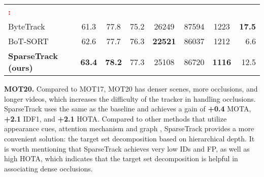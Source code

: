 \begin{table}[t]
{\begin{tabular}{ l | c c c c c c r}
\midrule
\textcolor{red}{\textbf{  :}}\\
ByteTrack\cite{bytetrack} & 61.3 & 77.8 & 75.2 & 26249 & 87594 & 1223 & \textbf{17.5}\\
BoT-SORT\cite{BoT-SORT} & 62.6 & 77.7 & 76.3 & \textbf{22521} & 86037 & 1212 & 6.6 \\
\textbf{SparseTrack (ours)} & \textbf{63.4} & \textbf{78.2} & 77.3 & 25108 & 86720 & \textbf{1116} & 12.5\\
\bottomrule
\end{tabular}
}
\end{table}

\textbf{MOT20.} Compared to MOT17, MOT20 has denser scenes, more occlusions, and longer videos, which increases the difficulty of the tracker in handling occlusions. SparseTrack uses the same  as the baseline and achieves a gain of \textbf{+0.4} MOTA, \textbf{+2.1} IDF1, and \textbf{+2.1} HOTA. Compared to other methods that utilize appearance cues, attention mechanism \cite{attention, vit} and graph \cite{graph-mot,graph-mot1,Learnable_graph_matching}, SparseTrack provides a more convenient solution: the target set decomposition based on hierarchical depth. It is worth mentioning that SparseTrack achieves very low IDs and FP, as well as high HOTA, which indicates that the target set decomposition is helpful in associating dense occlusions.

